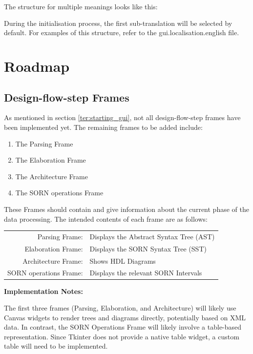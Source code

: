 \documentclass{article}
\begin{document}
The structure for multiple meanings looks like this:


During the initialisation process, the first sub-translation will be selected by default. For examples of this structure, refer to the gui.localisation.english file.

\newpage
\section{Roadmap}
\label{sec:roadmap}
\subsection{Design-flow-step Frames}
As mentioned in section \ref{ter:starting_gui}, not all design-flow-step frames have been implemented yet. The remaining frames to be added include:
\begin{enumerate}
    \item The Parsing Frame
    \item The Elaboration Frame
    \item The Architecture Frame
    \item The SORN operations Frame
\end{enumerate}
These Frames should contain and give information about the current phase of the data processing. The intended contents of each frame are as follows:
\begin{center}
    \begin{tabular}{rl}
        Parsing Frame: & Displays the Abstract Syntax Tree (AST) \\
        Elaboration Frame: & Displays the SORN Syntax Tree (SST) \\
        Architecture Frame: & Shows HDL Diagrams \\
        SORN operations Frame: & Displays the relevant SORN Intervals
    \end{tabular}
\end{center}

\textbf{\large Implementation Notes:}

The first three frames (Parsing, Elaboration, and Architecture) will likely use Canvas widgets to render trees and diagrams directly, potentially based on XML data. In contrast, the SORN Operations Frame will likely involve a table-based representation. Since Tkinter does not provide a native table widget, a custom table will need to be implemented.
\end{document}
